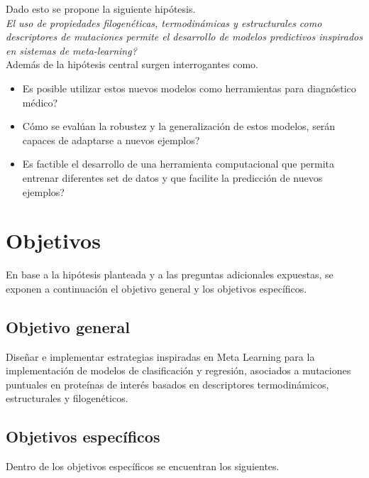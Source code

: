 Dado esto se propone la siguiente hipótesis.\\

\textit{El uso de propiedades filogenéticas, termodinámicas y estructurales como descriptores de mutaciones permite el desarrollo de modelos predictivos inspirados en sistemas de meta-learning?}\\

Además de la hipótesis central surgen interrogantes como.

\begin{itemize}
	
	\item Es posible utilizar estos nuevos modelos como herramientas para diagnóstico médico?
	\item Cómo se evalúan la robustez y la generalización de estos modelos, serán capaces de adaptarse a nuevos ejemplos?
	\item Es factible el desarrollo de una herramienta computacional que permita entrenar diferentes set de datos y que facilite la predicción de nuevos ejemplos?
	
\end{itemize}

\section{Objetivos}

En base a la hipótesis planteada y a las preguntas adicionales expuestas, se exponen a continuación el objetivo general y los objetivos específicos.

\subsection{Objetivo general}

Diseñar e implementar estrategias inspiradas en Meta Learning para la implementación de modelos de clasificación y regresión, asociados a mutaciones puntuales en proteínas de interés basados en descriptores termodinámicos, estructurales y filogenéticos.

\subsection{Objetivos específicos}

Dentro de los objetivos específicos se encuentran los siguientes.

